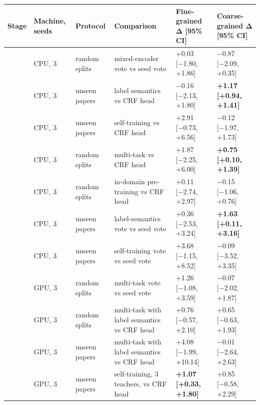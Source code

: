 \documentclass[11pt,a4paper]{article}
\begin{document}
\begin{table}[tp]
\centering\footnotesize\renewcommand{\arraystretch}{0.85}\setlength{\tabcolsep}{3.5pt}
\begin{tabular}{>{\raggedright\arraybackslash}p{}>{\raggedright\arraybackslash}p{}>{\raggedright\arraybackslash}p{}>{\raggedright\arraybackslash}p{}>{\raggedright\arraybackslash}p{}>{\raggedright\arraybackslash}p{}}
\toprule
\textbf{Stage} & \textbf{Machine, seeds} & \textbf{Protocol} & \textbf{Comparison} & \textbf{Fine-grained Δ {[}95\% CI{]}} & \textbf{Coarse-grained Δ {[}95\% CI{]}} \\
\midrule
3 & CPU, 3 & random splits & mixed-encoder vote vs seed vote & +0.03 {[}−1.80, +1.86{]} & −0.87 {[}−2.09, +0.35{]} \\
3 & CPU, 3 & unseen papers & label semantics vs CRF head & −0.16 {[}−2.13, +1.80{]} & \textbf{+1.17 {[}+0.94, +1.41{]}} \\
3 & CPU, 3 & unseen papers & self-training vs CRF head & +2.91 {[}−0.73, +6.56{]} & −0.12 {[}−1.97, +1.73{]} \\
3 & CPU, 3 & random splits & multi-task vs CRF head & +1.87 {[}−2.25, +6.00{]} & \textbf{+0.75 {[}+0.10, +1.39{]}} \\
3 & CPU, 3 & random splits & in-domain pre-training vs CRF head & +0.11 {[}−2.74, +2.97{]} & −0.15 {[}−1.06, +0.76{]} \\
4 & CPU, 3 & unseen papers & label-semantics vote vs seed vote & +0.36 {[}−2.53, +3.24{]} & \textbf{+1.63 {[}+0.11, +3.16{]}} \\
4 & CPU, 3 & unseen papers & self-training vote vs seed vote & +3.68 {[}−1.15, +8.52{]} & −0.09 {[}−3.52, +3.35{]} \\
4 & GPU, 3 & random splits & multi-task vote vs seed vote & +1.26 {[}−1.08, +3.59{]} & −0.07 {[}−2.02, +1.87{]} \\
4 & GPU, 3 & random splits & multi-task with label semantics vs CRF head & +0.76 {[}−0.57, +2.10{]} & +0.65 {[}−0.63, +1.93{]} \\
4 & GPU, 3 & unseen papers & multi-task with label semantics vs CRF head & +4.08 {[}−1.99, +10.14{]} & −0.01 {[}−2.64, +2.63{]} \\
4 & GPU, 3 & unseen papers & self-training, 3 teachers, vs CRF head & \textbf{+1.07 {[}+0.33, +1.80{]}} & +0.85 {[}−0.58, +2.29{]} \\

\end{tabular}
\end{table}
\end{document}
